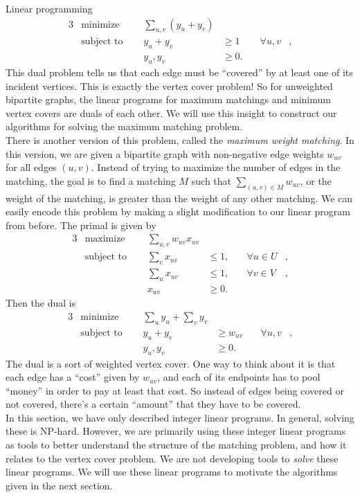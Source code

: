 \documentclass[11pt]{article}
\renewcommand{\'}{^{'}}
\begin{document}
\begin{section}{Linear programming}
	\begin{alignat}{3}
		& \text{minimize } & \sum_{u,v} (y_u + y_v)& \\
		& \text{subject to } \quad & y_u + y_v & \geq 1 & \quad \forall u,v &, \\
				    && y_u,y_v & \geq 0.
	\end{alignat}
	This dual problem tells us that each edge must be ``covered'' by at least one of its incident 
	vertices. This is exactly the vertex cover problem! So for unweighted bipartite graphs, the 
	linear programs for maximum matchings and minimum vertex covers are duals of each other. 
	We will use this insight to construct our algorithms for solving the maximum matching problem. 
	\\
	There is another version of this problem, called the \emph{maximum weight matching}. In this 
	version, we are given a bipartite graph with non-negative edge weights $w_{uv}$ for all 
	edges $(u,v)$. Instead of trying to maximize the number of edges in the matching, the goal 
	is to find a matching $M$ such that $\sum_{(u,v) \in M} w_{uv}$, or the weight of the matching, 
	is greater than the weight of any other matching. We can easily encode this problem by making 
	a slight modification to our linear program from before. The primal is given by
	\begin{alignat}{3}
		& \text{maximize } & \sum_{u,v} w_{uv}x_{uv}& \\
		& \text{subject to } \quad & \sum_{v} x_{uv} & \leq 1, & \quad \forall u\in U&, \\
				     &\quad & \sum_{u} x_{uv} & \leq 1, & \quad \forall v\in V &, \\
				&& x_{uv} & \geq 0.
	\end{alignat}
	Then the dual is
	\begin{alignat}{3}
		& \text{minimize } & \sum_{u} y_u + \sum_v y_v& \\
		& \text{subject to } \quad & y_u + y_v & \geq w_{uv} & \quad \forall u,v &, \\
				    && y_u,y_v & \geq 0.
	\end{alignat}
	The dual is a sort of weighted vertex cover. One way to think about it is that each edge 
	has a ``cost'' given by $w_{uv}$, and each of its endpoints has to pool ``money'' in order 
	to pay at least that cost. So instead of edges being covered or not covered, there's a certain 
	``amount'' that they have to be covered.\\
	In this section, we have only described integer linear programs. In general, solving these 
	is NP-hard. However, we are primarily using these integer linear programs as tools to better 
	understand the structure of the matching problem, and how it relates to the vertex cover 
	problem. We are not developing tools to \emph{solve} these linear programs.
	We will use these linear programs to motivate the algorithms given in the next section. 
\end{section}
\end{document}
